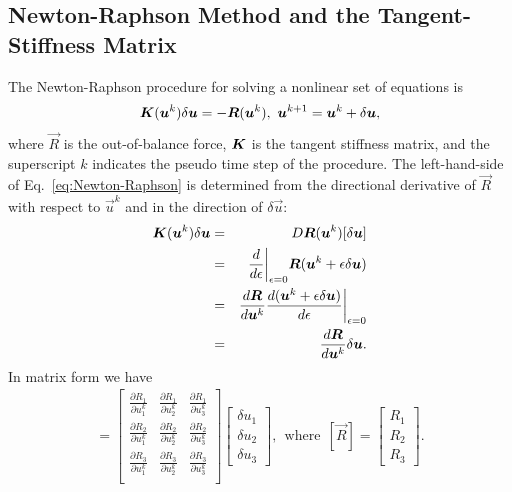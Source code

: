 \subsection{Newton-Raphson Method and the Tangent-Stiffness Matrix}
The Newton-Raphson procedure for solving a nonlinear set of equations is \cite{JavierBonet:2008uxa}
%
\begin{eqnarray}
\bm{K}(\bm{u}^k) \delta \bm{u} = - \bm{R}(\bm{u}^k), \ \bm{u}^{k+1} = \bm{u}^k + \delta \bm{u},
\label{eq:Newton-Raphson}
\end{eqnarray}
%
where $\vec{R}$ is the out-of-balance force, $\bm{K}$ is the tangent stiffness matrix, and the superscript $k$ indicates the pseudo time step of the procedure. The left-hand-side of  Eq.\ \eqref{eq:Newton-Raphson} is determined from the directional derivative of $\vec{R}$ with respect to $\vec{u}^k$ and in the direction of $\delta \vec{u}$:
%
\begin{eqnarray}
\mat{K}(\vec{u}^k) \delta \vec{u} &=& D\vec{R}(\vec{u}^k)[\delta \vec{u}] \nonumber\\
%
&=& \frac{d}{d\epsilon} \bigg|_{\epsilon=0}\vec{R}(\vec{u}^k + \epsilon \delta \vec{u}) \nonumber\\
&=& \frac{d \vec{R}}{d\vec{u}^k} \frac{d(\vec{u}^k + \epsilon \delta \vec{u})}{d\epsilon} \bigg|_{\epsilon=0} \nonumber\\
&=& \frac{d \vec{R}}{d\vec{u}^k} \delta \vec{u}.
\label{eq:DR[u]}
\end{eqnarray}
%
In matrix form we have
%
\begin{eqnarray}
[\mat{K}(\vec{u}^k)][\delta \vec{u}] =
%
\begin{bmatrix}
\frac{\partial R_1}{\partial u_1^k} & \frac{\partial R_1}{\partial u_2^k} & \frac{\partial R_1}{\partial u_3^k} \\
%
\frac{\partial R_2}{\partial u_1^k} & \frac{\partial R_2}{\partial u_2^k} & \frac{\partial R_2}{\partial u_3^k} \\
%
\frac{\partial R_3}{\partial u_1^k} & \frac{\partial R_3}{\partial u_2^k} & \frac{\partial R_3}{\partial u_3^k} \\
\end{bmatrix}
%
\begin{bmatrix}
\delta u_1 \\ \delta u_2 \\ \delta u_3
\end{bmatrix}, \ \ \text{where} \ \ 
%
[\vec{R}] = 
\begin{bmatrix}
R_1 \\ R_2 \\ R_3
\end{bmatrix}.
\label{eq:DR[u]_matrix}
\end{eqnarray}
%

